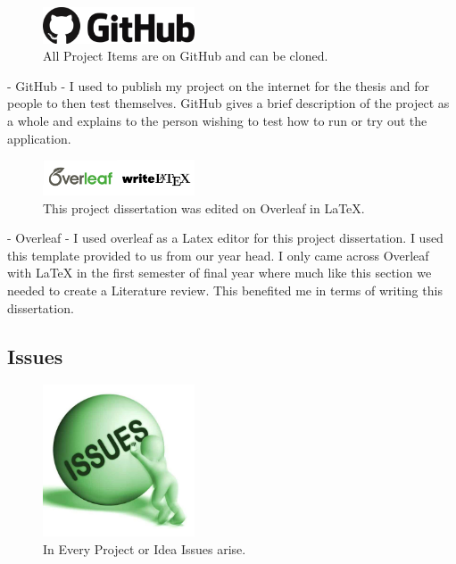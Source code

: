 \begin{figure}[h!]
	\caption{All Project Items are on GitHub and can be cloned.}
	\label{image:github1}
	\centering
	\includegraphics[width=0.4\textwidth]{images/github.png}
\end{figure}

- GitHub - I used to publish my project on the internet for the thesis and for people to then test themselves. GitHub gives a brief description of the project as a whole and explains to the person wishing to test how to run or try out the application. 
\newline

\begin{figure}[h!]
	\caption{This project dissertation was edited on Overleaf in LaTeX.}
	\label{image:overleaf-latex}
	\centering
	\includegraphics[width=0.4\textwidth]{images/overleaf-latex.png}
\end{figure}
\newpage
- Overleaf - I used overleaf as a Latex editor for this project dissertation. I used this template provided to us from our year head. I only came across Overleaf with LaTeX in the first semester of final year where much like this section we needed to create a Literature review. This benefited me in terms of writing this dissertation.

\subsection{Issues}

\begin{figure}[h!]
	\caption{In Every Project or Idea Issues arise.}
	\label{image:issues}
	\centering
	\includegraphics[width=0.4\textwidth]{images/issues.jpg}
\end{figure}

